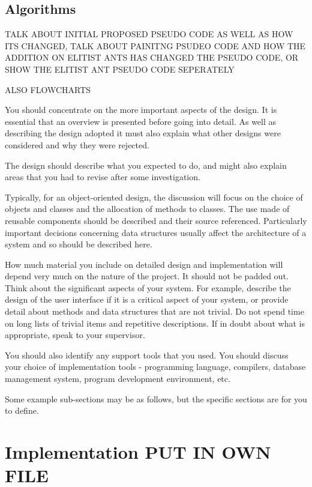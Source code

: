 \section{Algorithms}

TALK ABOUT INITIAL PROPOSED PSEUDO CODE AS WELL AS HOW ITS CHANGED, TALK ABOUT PAINITNG PSUDEO CODE AND HOW THE ADDITION ON ELITIST ANTS HAS CHANGED THE PSEUDO CODE, OR SHOW THE ELITIST ANT PSEUDO CODE SEPERATELY 

ALSO FLOWCHARTS

You should concentrate on the more important aspects of the design. It is essential that an overview is presented before going into detail. As well as describing the design adopted it must also explain what other designs were considered and why they were rejected.

The design should describe what you expected to do, and might also explain areas that you had to revise after some investigation.

Typically, for an object-oriented design, the discussion will focus on the choice of objects and classes and the allocation of methods to classes. The use made of reusable components should be described and their source referenced. Particularly important decisions concerning data structures usually affect the architecture of a system and so should be described here.

How much material you include on detailed design and implementation will depend very much on the nature of the project. It should not be padded out. Think about the significant aspects of your system. For example, describe the design of the user interface if it is a critical aspect of your system, or provide detail about methods and data structures that are not trivial. Do not spend time on long lists of trivial items and repetitive descriptions. If in doubt about what is appropriate, speak to your supervisor.
 
You should also identify any support tools that you used. You should discuss your choice of implementation tools - programming language, compilers, database management system, program development environment, etc.

Some example sub-sections may be as follows, but the specific sections are for you to define. 

\chapter{Implementation PUT IN OWN FILE}

